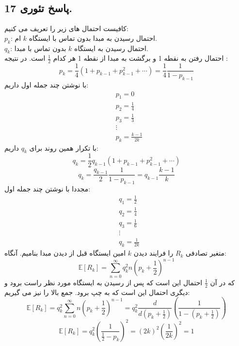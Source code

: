 \documentclass[]{article}
\begin{document}
\subsection{پاسخ تئوری 17.}
کافیست احتمال های زیر را تعریف می کنیم:\\
$p_k$:
احتمال رسیدن به مبدا بدون تماس با ایستگاه 
$k$
ام.\\
$q_k$:
احتمال رسیدن به ایستگاه 
$k$
بدون تماس با مبدا.\\
احتمال رفتن به نقطه 1 و برگشت به مبدا از نقطه 1 هر کدام 
$\frac{1}{2}$
است. در نتیجه :
\begin{equation}
	\nonumber
	p_k = \frac{1}{4} (1+ p_{k-1} + p_{k-1}^2 + \cdots) = \frac{1}{4} \frac{1}{1-p_{k-1}}
\end{equation}
با نوشتن چند جمله اول داریم:
\begin{equation}
	\nonumber
	\begin{split}
		&p_1 = 0\\
		&p_2 = \frac{1}{4}\\
		&p_3 = \frac{1}{3}\\
		&\vdots\\
		&p_k = \frac{k - 1}{2k}
	\end{split}
\end{equation}
با تکرار همین روند برای 
$q_k$
داریم:
\begin{equation}
	\nonumber
	q_k = \frac{1}{2} q_{k-1} (1 + p_{k-1} + p_{k-1}^2 + \cdots)
\end{equation}
\begin{equation}
	\nonumber
	q_k = \frac{q_{k-1}}{2} \frac{1}{1-p_{k-1}} = q_{k-1} \frac{k-1}{k}
\end{equation}
مجددا با نوشتن چند جمله اول:
\begin{equation}
	\nonumber
	\begin{split}
		&q_1 = \frac{1}{2}\\
		&q_2 = \frac{1}{4}\\
		&q_3 = \frac{1}{6}\\
		&\vdots\\
		&q_k = \frac{1}{2k}
	\end{split}
\end{equation}
متغیر تصادفی 
$R_k$
را فرایند دیدن $k$ امین ایستگاه قبل از دیدن مبدا بنامیم. آنگاه:
\begin{equation}
	\nonumber
	\mathbb{E}[R_k] = \sum_{n = 0}^{\infty} q_k^2 n(p_k + \frac{1}{2})^{n-1}
\end{equation}
که در آن 
$\frac{1}{2}$
احتمال این است که پس از رسیدن به ایستگاه مورد نظر راست برود و دیگری احتمال این است که به چپ برود. جمع بالا را نیز می گیریم:
\begin{equation}
	\nonumber
	\mathbb{E}[R_k] = q_k^2 \sum_{n = 0}^{\infty} n(p_k + \frac{1}{2})^{n-1}
	= q_k^2 \frac{d}{d(p_k + \frac{1}{2})} (\frac{1}{1-(p_k + \frac{1}{2})})
\end{equation}
\begin{equation}
	\nonumber
	\mathbb{E}[R_k] = q_k^2 (\frac{1}{\frac{1}{2} - p_k})^2 = (2k)^2(\frac{1}{2k})^2 = 1
\end{equation}
\newpage
\end{document}
